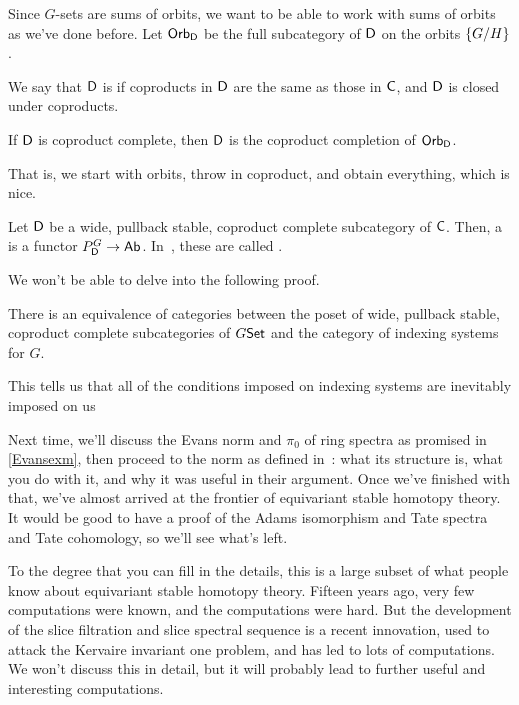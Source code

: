 Since $G$-sets are sums of orbits, we want to be able to work with sums of orbits as we've done before. Let
$\mathsf{Orb}_\mathsf D$ be the full subcategory of $\mathsf D$ on the orbits $\{G/H\}$.
\begin{defn}
We say that $\mathsf D$ is  if coproducts in $\mathsf D$ are the same as those in $\mathsf C$, and $\mathsf D$ is
closed under coproducts.
\end{defn}
\begin{lem}
If $\mathsf D$ is coproduct complete, then $\mathsf D$ is the coproduct completion of $\mathsf{Orb}_\mathsf D$.
\end{lem}
That is, we start with orbits, throw in coproduct, and obtain everything, which is nice.
\begin{defn}
Let $\mathsf D$ be a wide, pullback stable, coproduct complete subcategory of $\mathsf C$. Then, a 
is a functor $P_\mathsf D^G\to\mathsf{Ab}$. In~\cite{BlumbergHill}, these are called .
\end{defn}
We won't be able to delve into the following proof.
\begin{thm}
There is an equivalence of categories between the poset of wide, pullback stable, coproduct complete subcategories
of $G\mathsf{Set}$ and the category of indexing systems for $G$.
\end{thm}
This tells us that all of the conditions imposed on indexing systems are inevitably imposed on us 

Next time, we'll discuss the Evans norm and $\pi_0$ of ring spectra as promised in \cref{Evansexm}, then proceed to
the norm as defined in~\cite{HHR}: what its structure is, what you do with it, and why it was useful in their
argument. Once we've finished with that, we've almost arrived at the frontier of equivariant stable homotopy
theory. It would be good to have a proof of the Adams isomorphism and Tate spectra and Tate cohomology, so we'll
see what's left.

To the degree that you can fill in the details, this is a large subset of what people know about equivariant stable
homotopy theory. Fifteen years ago, very few computations were known, and the computations were hard. But the
development of the slice filtration and slice spectral sequence is a recent innovation, used to attack the Kervaire
invariant one problem, and has led to lots of computations. We won't discuss this in detail, but it will probably
lead to further useful and interesting computations.
